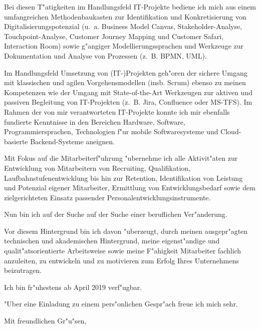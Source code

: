 \documentclass[10pt,a4paper]{dinbrief}
\begin{document}
\begin{letter}
Bei diesen T"atigkeiten im Handlungsfeld IT-Projekte bediene ich mich aus einem umfangreichen Methodenbaukasten zur Identifikation und Konkretisierung von Digitalisierungspotenzial (u.~a. Business Model Canvas, Stakeholder-Analyse, Touchpoint-Analyse, Customer Journey Mapping und Customer Safari, Interaction Room) sowie g"angiger Modellierungssprachen und Werkzeuge zur Dokumentation und Analyse von Prozessen (z.~B. BPMN, UML).

Im Handlungsfeld Umsetzung von (IT-)Projekten geh"oren der sichere Umgang mit klassischen und agilen Vorgehensmodellen (insb. Scrum) ebenso zu meinen Kompetenzen wie der Umgang mit State-of-the-Art Werkzeugen zur aktiven und passiven Begleitung von IT-Projekten (z.~B. Jira, Confluence oder MS-TFS). Im Rahmen der von mir verantworteten IT-Projekte konnte ich mir ebenfalls fundierte Kenntnisse in den Bereichen Hardware, Software, Programmiersprachen, Technologien f"ur mobile Softwaresysteme und Cloud-basierte Backend-Systeme aneignen. 

Mit Fokus auf die Mitarbeiterf"uhrung "ubernehme ich alle Aktivit"aten zur Entwicklung von Mitarbeitern von Recruiting, Qualifikation, Laufbahnstufenentwicklung bis hin zur Retention, Identifikation von Leistung und Potenzial eigener Mitarbeiter, Ermittlung von Entwicklungsbedarf sowie dem zielgerichteten Einsatz passender Personalentwicklungsinstrumente.

Nun bin ich auf der Suche auf der Suche einer beruflichen Ver"anderung.

Vor diesem Hintergrund bin ich davon "uberzeugt, durch meinen ausgepr"agten technischen und akademischen Hintergrund, meine eigenst"andige und qualit"atsorientierte Arbeitsweise sowie meine F"ahigkeit Mitarbeiter fachlich anzuleiten, zu entwickeln und zu motivieren zum Erfolg Ihres Unternehmens beizutragen.

Ich bin fr"uhestens ab April 2019 verf"ugbar.

"Uber eine Einladung zu einem pers"onlichen Gespr"ach freue ich mich sehr.

\closing{Mit freundlichen Gr"u"sen,}
\end{letter}
\end{document}
